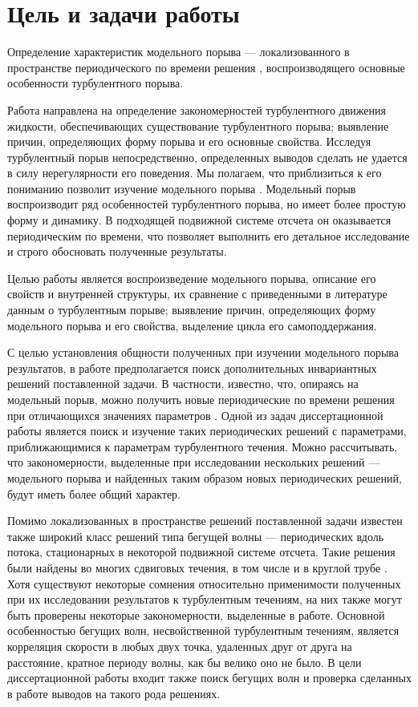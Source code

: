 \section{Цель и задачи работы}

Определение характеристик модельного порыва --- локализованного в пространстве периодического по времени решения \cite{Avila2013}, воспроизводящего основные особенности турбулентного порыва. 


Работа направлена на определение закономерностей турбулентного движения жидкости, обеспечивающих существование турбулентного порыва; выявление причин, определяющих форму порыва и его основные свойства. Исследуя турбулентный порыв непосредственно, определенных выводов сделать не удается в силу нерегулярности его поведения. Мы полагаем, что приблизиться к его пониманию позволит изучение модельного порыва \cite{Avila2013}. Модельный порыв воспроизводит ряд особенностей турбулентного порыва, но имеет более простую форму и динамику. В подходящей подвижной системе отсчета он оказывается периодическим по времени, что позволяет выполнить его детальное исследование и строго обосновать полученные результаты.

Целью работы является воспроизведение модельного порыва, описание его свойств и внутренней структуры, их сравнение с приведенными в литературе данным о турбулентным порыве; выявление причин, определяющих форму модельного порыва и его свойства, выделение цикла его самоподдержания. 

С целью установления общности полученных при изучении модельного порыва результатов, в работе предполагается поиск дополнительных инвариантных решений поставленной задачи. В частности, известно, что, опираясь на модельный порыв, можно получить новые периодические по времени решения при отличающихся значениях параметров \cite{Viswanath2007, Dijkstra2014}. Одной из задач диссертационной работы является поиск и изучение таких периодических решений с параметрами, приближающимися к параметрам турбулентного течения. Можно рассчитывать, что закономерности, выделенные при исследовании нескольких решений --- модельного порыва и найденных таким образом новых периодических решений, будут иметь более общий характер. 

Помимо локализованных в пространстве решений поставленной задачи известен также широкий класс решений типа бегущей волны --- периодических вдоль потока, стационарных в некоторой подвижной системе отсчета. Такие решения были найдены во многих сдвиговых течения, в том числе и в круглой трубе \cite{Kawahara2012}. Хотя существуют некоторые сомнения относительно применимости полученных при их исследовании результатов к турбулентным течениям, на них также могут быть проверены некоторые закономерности, выделенные в работе. Основной особенностью бегущих волн, несвойственной турбулентным течениям, является корреляция скорости в любых двух точка, удаленных друг от друга на расстояние, кратное периоду волны, как бы велико оно не было. В цели диссертационной работы входит также поиск бегущих волн и проверка сделанных в работе выводов на такого рода решениях. 


